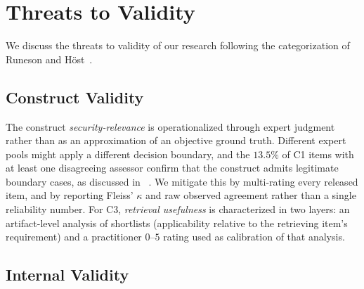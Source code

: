 \section{Threats to Validity}
We discuss the threats to validity of our research following the categorization of Runeson and Höst~\cite{Runeson2009}.
\subsection{Construct Validity}

The construct \emph{security-relevance} is operationalized through expert judgment rather than as an approximation of an objective ground truth. 
Different expert pools might apply a different decision boundary, and the $13.5\%$ of C1 items with at least one disagreeing assessor confirm that the construct admits legitimate boundary cases, as discussed in ~.
We mitigate this by multi-rating every released item, and by reporting Fleiss' $\kappa$ and raw observed agreement rather than a single reliability number.
For C3, \emph{retrieval usefulness} is characterized in two layers: an artifact-level analysis of shortlists (applicability relative to the retrieving item's requirement) and a practitioner $0$--$5$ rating used as calibration of that analysis.

\subsection{Internal Validity}

